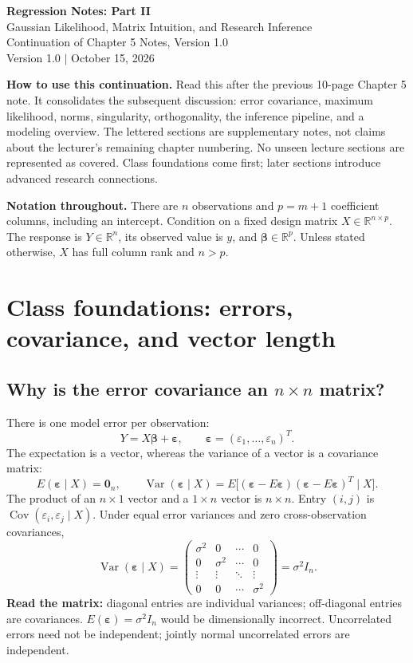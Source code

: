 \documentclass[11pt]{article}
\newcommand{\be}{\boldsymbol\beta}\newcommand{\eps}{\boldsymbol\varepsilon}\newcommand{\one}{\mathbf1}\newcommand{\R}{\mathbb R}
\begin{document}
\begin{center}
{\LARGE\bfseries Regression Notes: Part II}\\[5pt]
{\large Gaussian Likelihood, Matrix Intuition, and Research Inference}\\[5pt]
Continuation of Chapter 5 Notes, Version 1.0\\
Version 1.0 $\mid$ October 15, 2026
\end{center}
\textbf{How to use this continuation.} Read this after the previous 10-page Chapter 5 note. It consolidates the subsequent discussion: error covariance, maximum likelihood, norms, singularity, orthogonality, the inference pipeline, and a modeling overview. The lettered sections are supplementary notes, not claims about the lecturer's remaining chapter numbering. No unseen lecture sections are represented as covered. Class foundations come first; later sections introduce advanced research connections.

\textbf{Notation throughout.} There are $n$ observations and $p=m+1$ coefficient columns, including an intercept. Condition on a fixed design matrix $X\in\R^{n\times p}$. The response is $Y\in\R^n$, its observed value is $y$, and $\be\in\R^p$. Unless stated otherwise, $X$ has full column rank and $n>p$.

\renewcommand{\thesection}{\Alph{section}}
\setcounter{tocdepth}{1}
\tableofcontents
\clearpage
{}
\section{Class foundations: errors, covariance, and vector length}
\subsection{Why is the error covariance an $n\times n$ matrix?}
There is one model error per observation:
\[
Y=X\be+\eps,\qquad \eps=(\varepsilon_1,\ldots,\varepsilon_n)^T.
\]
The expectation is a vector, whereas the variance of a vector is a covariance matrix:
\[
E(\eps\mid X)=\mathbf0_n,\qquad
\operatorname{Var}(\eps\mid X)
=E\big[(\eps-E\eps)(\eps-E\eps)^T\mid X\big].
\]
The product of an $n\times1$ vector and a $1\times n$ vector is $n\times n$. Entry $(i,j)$ is $\operatorname{Cov}(\varepsilon_i,\varepsilon_j\mid X)$.
Under equal error variances and zero cross-observation covariances,
\[
\operatorname{Var}(\eps\mid X)=
\begin{pmatrix}\sigma^2&0&\cdots&0\\0&\sigma^2&\cdots&0\\\vdots&\vdots&\ddots&\vdots\\0&0&\cdots&\sigma^2\end{pmatrix}
=\boxed{\sigma^2I_n}.
\]
\textbf{Read the matrix:} diagonal entries are individual variances; off-diagonal entries are covariances. $E(\eps)=\sigma^2I_n$ would be dimensionally incorrect. Uncorrelated errors need not be independent; jointly normal uncorrelated errors are independent.
\end{document}
